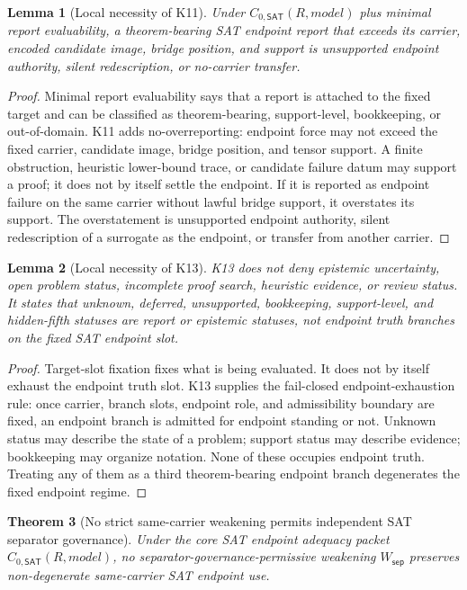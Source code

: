 \documentclass[11pt]{article}
\newtheorem{theorem}{Theorem}[section]
\newtheorem{lemma}[theorem]{Lemma}
\theoremstyle{definition}
\theoremstyle{remark}
\newcommand{\CoreSAT}{C_{0,\mathsf{SAT}}}
\newcommand{\WeakSep}{W_{\mathsf{sep}}}
\begin{document}
\begin{lemma}[Local necessity of K11]\label{lem:sat-k11-necessity}
Under \(\CoreSAT(R,model)\) plus minimal report evaluability, a theorem-bearing SAT endpoint report that exceeds its carrier, encoded candidate image, bridge position, and support is unsupported endpoint authority, silent redescription, or no-carrier transfer.
\end{lemma}

\begin{proof}
Minimal report evaluability says that a report is attached to the fixed target and can be classified as theorem-bearing, support-level, bookkeeping, or out-of-domain. K11 adds no-overreporting: endpoint force may not exceed the fixed carrier, candidate image, bridge position, and tensor support. A finite obstruction, heuristic lower-bound trace, or candidate failure datum may support a proof; it does not by itself settle the endpoint. If it is reported as endpoint failure on the same carrier without lawful bridge support, it overstates its support. The overstatement is unsupported endpoint authority, silent redescription of a surrogate as the endpoint, or transfer from another carrier.
\end{proof}

\begin{lemma}[Local necessity of K13]\label{lem:sat-k13-necessity}
K13 does not deny epistemic uncertainty, open problem status, incomplete proof search, heuristic evidence, or review status. It states that unknown, deferred, unsupported, bookkeeping, support-level, and hidden-fifth statuses are report or epistemic statuses, not endpoint truth branches on the fixed SAT endpoint slot.
\end{lemma}

\begin{proof}
Target-slot fixation fixes what is being evaluated. It does not by itself exhaust the endpoint truth slot. K13 supplies the fail-closed endpoint-exhaustion rule: once carrier, branch slots, endpoint role, and admissibility boundary are fixed, an endpoint branch is admitted for endpoint standing or not. Unknown status may describe the state of a problem; support status may describe evidence; bookkeeping may organize notation. None of these occupies endpoint truth. Treating any of them as a third theorem-bearing endpoint branch degenerates the fixed endpoint regime.
\end{proof}

\begin{theorem}[No strict same-carrier weakening permits independent SAT separator governance]\label{thm:no-strict-sat-weakening-permits-separator-governance}
Under the core SAT endpoint adequacy packet \(\CoreSAT(R,model)\), no separator-governance-permissive weakening \(\WeakSep\) preserves non-degenerate same-carrier SAT endpoint use.
\end{theorem}
\end{document}
